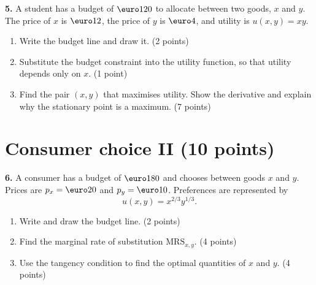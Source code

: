 \documentclass[11pt,a4paper]{article}
\begin{document}
\textbf{5.} A student has a budget of \(\text{\euro}120\) to allocate between
two goods, \(x\) and \(y\). The price of \(x\) is \(\text{\euro}12\), the
price of \(y\) is \(\text{\euro}4\), and utility is \(u(x,y)=xy\).

\begin{enumerate}[label=\textbf{\alph*.}]
  \item Write the budget line and draw it. \hfill (2 points)
  \item Substitute the budget constraint into the utility function, so that
        utility depends only on \(x\). \hfill (1 point)
  \item Find the pair \((x,y)\) that maximises utility. Show the derivative
        and explain why the stationary point is a maximum. \hfill (7 points)
\end{enumerate}

\vspace{1.0em}
\begin{center}
\end{center}

\vfill
\newpage
\section{Consumer choice II \hfill (10 points)}

\textbf{6.} A consumer has a budget of \(\text{\euro}180\) and chooses between
goods \(x\) and \(y\). Prices are \(p_x=\text{\euro}20\) and
\(p_y=\text{\euro}10\). Preferences are represented by
\[
u(x,y)=x^{2/3}y^{1/3}.
\]

\begin{enumerate}[label=\textbf{\alph*.}]
  \item Write and draw the budget line. \hfill (2 points)
  \item Find the marginal rate of substitution \(\mathrm{MRS}_{x,y}\).
        \hfill (4 points)
  \item Use the tangency condition to find the optimal quantities of \(x\)
        and \(y\). \hfill (4 points)
\end{enumerate}
\end{document}
